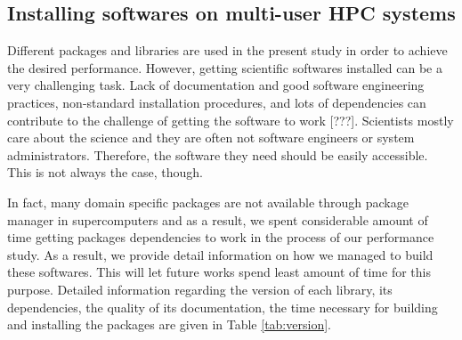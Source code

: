 \subsection{Installing softwares on multi-user HPC systems}
Different packages and libraries are used in the present study in order to achieve the desired performance. 
However, getting scientific softwares installed can be a very challenging task.
Lack of documentation and good software engineering practices, non-standard installation procedures, and lots of dependencies can contribute to the challenge of getting the software to work [???].
Scientists mostly care about the science and they are often not software engineers or system administrators. 
Therefore, the software they need should be easily accessible. 
This is not always the case, though.

In fact, many domain specific packages are not available through package manager in supercomputers and as a result,
we spent considerable amount of time getting packages dependencies to work in the process of our performance study. 
As a result, we provide detail information on how we managed to build these softwares.
This will let future works spend least amount of time for this purpose. 
Detailed information regarding the version of each library, its dependencies, the quality of its documentation, the time necessary for building and installing the packages are given in Table \ref{tab:version}. 


